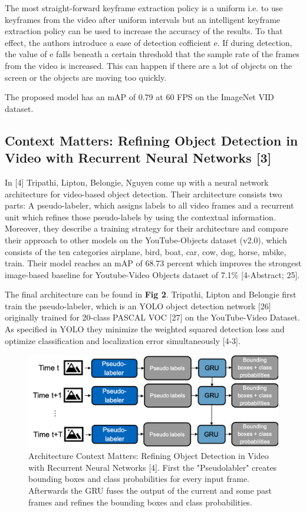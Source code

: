 \documentclass[conference]{IEEEtran}
\begin{document}
The most straight-forward keyframe extraction policy is a uniform i.e. to use keyframes from the video after uniform intervals but an intelligent keyframe extraction policy can be used to increase the accuracy of the results. To that effect, the authors introduce a ease of detection cofficient e. If during detection, the value of e falls beneath a certain threshold that the sample rate of the frames from the video is increased. This can happen if there are a lot of objects on the screen or the objects are moving too quickly. \newline

The proposed model has an mAP of 0.79 at 60 FPS on the ImageNet VID dataset. \newline

\subsection{Context Matters: Refining Object Detection in Video with Recurrent Neural Networks [3]}
In [4] Tripathi, Lipton, Belongie, Nguyen come up with a neural network architecture for video-based object detection. Their architecture consists two parts: A pseudo-labeler, which assigns labels to all video frames and a recurrent unit which refines those pseudo-labels by using the contextual information. Moreover, they describe a training strategy for their architecture and compare their approach to other models on the YouTube-Objects dataset (v2.0), which consists of the ten categories airplane, bird, boat, car, cow, dog, horse, mbike, train. Their model reaches an mAP of 68.73 percent which improves the strongest image-based baseline for Youtube-Video Objects dataset of 7.1\% [4-Abstract; 25]. \newline

The final architecture can be found in \textbf{Fig 2}. Tripathi, Lipton and Belongie first train the pseudo-labeler, which is an YOLO object detection network [26] originally trained for 20-class PASCAL VOC [27] on the YouTube-Video Dataset. As specified in YOLO  they minimize the weighted squared detection loss and optimize classification and localization error simultaneously [4-3]. 

\begin{figure} [h]
\includegraphics[width=\columnwidth]{ContextMatters}
\caption{Architecture Context Matters: Refining Object Detection in Video with Recurrent Neural Networks [4]. First the "Pseudolabler" creates bounding boxes and class probabilities for every input frame. Afterwards the GRU fuses the output of the current and some past frames and refines the bounding boxes and class probabilities.}
\end{figure}
\end{document}
